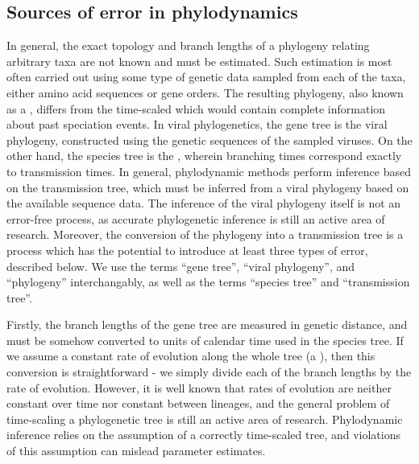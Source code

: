 \subsection{Sources of error in phylodynamics}

In general, the exact topology and branch lengths of a phylogeny relating
arbitrary taxa are not known and must be estimated. Such estimation is most
often carried out using some type of genetic data sampled from each of the
taxa, either amino acid sequences or gene orders. The resulting phylogeny, also
known as a , differs from the time-scaled 
which would contain complete information about past speciation events. In
viral phylogenetics, the gene tree is the viral phylogeny, constructed using
the genetic sequences of the sampled viruses. On the other hand, the species
tree is the , wherein branching times correspond
exactly to transmission times. In general, phylodynamic methods perform
inference based on the transmission tree, which must be inferred from a viral
phylogeny based on the available sequence data. The inference of the viral
phylogeny itself is not an error-free process, as accurate phylogenetic
inference is still an active area of research. Moreover, the conversion of the
phylogeny into a transmission tree is a process which has the potential to
introduce at least three types of error, described below. We use the terms
``gene tree'', ``viral phylogeny'', and ``phylogeny'' interchangably, as well
as the terms ``species tree'' and ``transmission tree''.

Firstly, the branch lengths of the gene tree are measured in genetic distance,
and must be somehow converted to units of calendar time used in the species
tree. If we assume a constant rate of evolution along the whole tree (a
), then this conversion is straightforward - we
simply divide each of the branch lengths by the rate of evolution. However, it
is well known that rates of evolution are neither constant over time nor
constant between lineages, and the general problem of time-scaling a
phylogenetic tree is still an active area of research. Phylodynamic inference
relies on the assumption of a correctly time-scaled tree, and violations of
this assumption can mislead parameter estimates.

